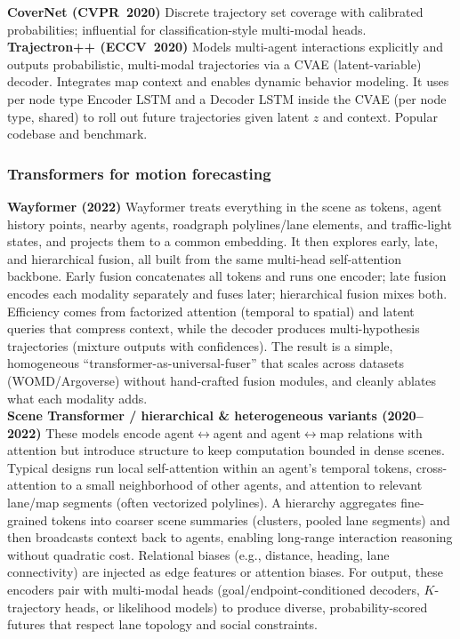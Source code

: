 \documentclass[12pt,a4paper]{report}
\begin{document}
\textbf{CoverNet (CVPR~2020)} Discrete trajectory set coverage with calibrated probabilities; influential for classification-style multi-modal heads. \cite{CoverNet2020} \\

\textbf{Trajectron++ (ECCV~2020)} Models multi-agent interactions explicitly and outputs probabilistic, multi-modal trajectories via a CVAE (latent-variable) decoder. Integrates map context and enables dynamic behavior modeling. It uses per node type Encoder LSTM and a Decoder LSTM inside the CVAE (per node type, shared) to roll out future trajectories given latent \(z\) and context. Popular codebase and benchmark. \cite{TrajectronPP2020} \\

\subsubsection{Transformers for motion forecasting}
\quad \textbf{Wayformer (2022)} Wayformer treats everything in the scene as tokens, agent history points, nearby agents, roadgraph polylines/lane elements, and traffic-light states, and projects them to a common embedding. It then explores early, late, and hierarchical fusion, all built from the same multi-head self-attention backbone. Early fusion concatenates all tokens and runs one encoder; late fusion encodes each modality separately and fuses later; hierarchical fusion mixes both. Efficiency comes from factorized attention (temporal to spatial) and latent queries that compress context, while the decoder produces multi-hypothesis trajectories (mixture outputs with confidences). The result is a simple, homogeneous ``transformer-as-universal-fuser'' that scales across datasets (WOMD/Argoverse) without hand-crafted fusion modules, and cleanly ablates what each modality adds. \cite{Wayformer2022}\\

\textbf{Scene Transformer / hierarchical \& heterogeneous variants (2020--2022)} These models encode agent\(\leftrightarrow\)agent and agent\(\leftrightarrow\)map relations with attention but introduce structure to keep computation bounded in dense scenes. Typical designs run local self-attention within an agent’s temporal tokens, cross-attention to a small neighborhood of other agents, and attention to relevant lane/map segments (often vectorized polylines). A hierarchy aggregates fine-grained tokens into coarser scene summaries (clusters, pooled lane segments) and then broadcasts context back to agents, enabling long-range interaction reasoning without quadratic cost. Relational biases (e.g., distance, heading, lane connectivity) are injected as edge features or attention biases. For output, these encoders pair with multi-modal heads (goal/endpoint-conditioned decoders, \(K\)-trajectory heads, or likelihood models) to produce diverse, probability-scored futures that respect lane topology and social constraints. \cite{Ngiam2021SceneTransformer}\\
\end{document}
